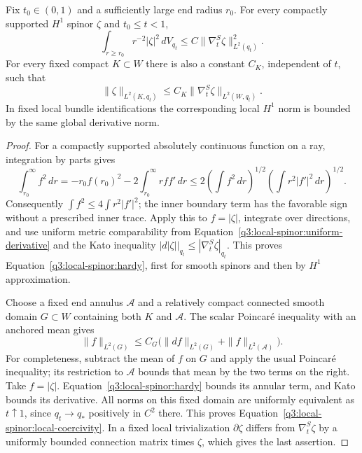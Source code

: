 \begin{lemma}
\label{q3:local-spinor:coercivity}
Fix $t_0\in(0,1)$ and a sufficiently large end radius $r_0$.
For every compactly supported $H^1$ spinor $\zeta$ and
$t_0\le t<1$,
\begin{equation}\label{q3:local-spinor:hardy}
 \int_{r\ge r_0}r^{-2}|\zeta|^2\,dV_{q_t}
       \le C\|\nabla^S_t\zeta\|_{L^2(q_t)}^2.
\end{equation}
For every fixed compact $K\subset W$ there is also a constant
$C_K$, independent of $t$, such that
\begin{equation}\label{q3:local-spinor:local-coercivity}
 \|\zeta\|_{L^2(K,q_t)}
       \le C_K\|\nabla^S_t\zeta\|_{L^2(W,q_t)}.
\end{equation}
In fixed local bundle identifications the corresponding local
$H^1$ norm is bounded by the same global derivative norm.
\end{lemma}

\begin{proof}
For a compactly supported absolutely continuous function on a ray,
integration by parts gives
\[
 \int_{r_0}^{\infty}f^2\,dr
   =-r_0 f(r_0)^2-2\int_{r_0}^{\infty}rff'\,dr
   \le2\left(\int f^2\,dr\right)^{1/2}
          \left(\int r^2|f'|^2\,dr\right)^{1/2}.
\]
Consequently $\int f^2\le4\int r^2|f'|^2$; the inner boundary
term has the favorable sign without a prescribed inner trace.
Apply this to $f=|\zeta|$, integrate over directions, and use
uniform metric comparability from Equation~\eqref{q3:local-spinor:uniform-derivative}
and the Kato inequality
$|d|\zeta||_{q_t}\le|\nabla^S_t\zeta|_{q_t}$.
This proves Equation~\eqref{q3:local-spinor:hardy}, first for smooth
spinors and then by $H^1$ approximation.

Choose a fixed end annulus $\mathcal A$ and a relatively compact
connected smooth domain $G\subset W$ containing both $K$ and
$\mathcal A$.  The scalar Poincar\'e inequality with an anchored
mean gives
\[
 \|f\|_{L^2(G)}\le C_G
       \bigl(\|df\|_{L^2(G)}+\|f\|_{L^2(\mathcal A)}\bigr).
\]
For completeness, subtract the mean of $f$ on $G$ and apply the
usual Poincar\'e inequality; its restriction to $\mathcal A$
bounds that mean by the two terms on the right.
Take $f=|\zeta|$.  Equation~\eqref{q3:local-spinor:hardy} bounds its
annular term, and Kato bounds its derivative.  All norms on this
fixed domain are uniformly equivalent as $t\uparrow1$, since
$q_t\to q_*$ positively in $C^2$ there.  This proves
Equation~\eqref{q3:local-spinor:local-coercivity}.  In a fixed local
trivialization $\partial\zeta$ differs from
$\nabla^S_t\zeta$ by a uniformly bounded connection matrix times
$\zeta$, which gives the last assertion.
\end{proof}

